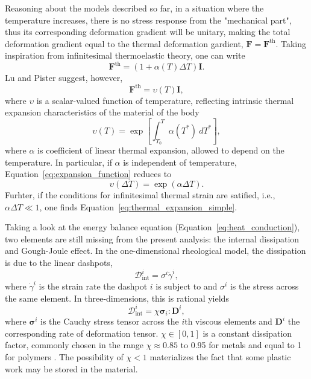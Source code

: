 Reasoning about the models described so far, in a situation where the temperature increases, there is no stress response from the "mechanical part", thus its corresponding deformation gradient will be unitary, making the total deformation gradient equal to the thermal deformation gardient, $\mathbf F = \mathbf F^\text{th}$.
Taking inspiration from infinitesimal thermoelastic theory, one can write
\begin{equation}
	\label{eq:thermal_expansion_simple}
	\mathbf F^\text{th} = (1 + \alpha(T)\Delta T)\mathbf I.
\end{equation}
Lu and Pister \citep{luDecompositionDeformationRepresentation1975} suggest, however,
\begin{equation}
	\mathbf F^\text{th} = \upsilon(T)\mathbf I,
\end{equation}
where $\upsilon$ is a scalar-valued function of temperature, reflecting intrinsic thermal expansion characteristics of the material of the body
\begin{equation}
	\label{eq:expansion_function}
	\upsilon(T) = \exp\left[\int_{T_0}^T \alpha(T^*)\ dT^*\right],
\end{equation}
where $\alpha$ is coefficient of linear thermal expansion, allowed to depend on the temperature.
In particular, if $\alpha$ is independent of temperature, Equation~\ref{eq:expansion_function} reduces to
\begin{equation}
	\upsilon(\Delta T) = \exp(\alpha \Delta T).
\end{equation}
Furhter, if the conditions for infinitesimal thermal strain are satified, i.e., $\alpha\Delta T \ll 1$, one finds Equation~\eqref{eq:thermal_expansion_simple}.

Taking a look at the energy balance equation (Equation~\eqref{eq:heat_conduction}), two elements are still missing from the present analysis: the internal dissipation and Gough-Joule effect.
In the one-dimensional rheological model, the dissipation is due to the linear dashpots,
\begin{equation}
	\mathcal D^i_\text{int} = \sigma^i {\dot\gamma}^i,
\end{equation}
where ${\dot \gamma}^i$ is the strain rate the dashpot $i$ is subject to and $\sigma^i$ is the stress across the same element.
In three-dimensions, this is rational yields
\begin{equation}
	\mathcal D_\text{int}^i = \chi\mathbf \sigma_i : \mathbf D^i,
\end{equation}
where $\bm \sigma^i$ is the Cauchy stress tensor across the $i$th viscous elements and $\mathbf D^i$ the corresponding rate of deformation tensor.
$\chi\in [0, 1]$ is a constant dissipation factor, commonly chosen in the range $\chi\approx 0.85$ to 0.95 for metals \citep{simoAssociativeCoupledThermoplasticity1992} and equal to 1 for polymers \citep{okerekeTwoprocessConstitutiveModel2019, haoRatedependentConstitutiveModel2022}.
The possibility of $\chi<1$ materializes the fact that some plastic work may be stored in the material.

